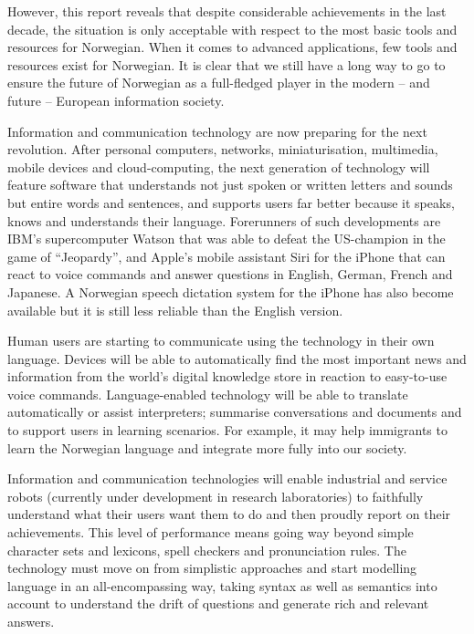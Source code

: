 \begin{multicols}{2}
However, this report reveals that despite considerable achievements in the last decade, the situation is only acceptable with respect to the most basic tools and resources for Norwegian. When it comes to advanced applications, few tools and resources exist for Norwegian. It is clear that we still have a long way to go to ensure the future of Norwegian as a full-fledged player in the modern -- and future -- European information society. 

Information and communication technology are now preparing for the next revolution. After personal computers, networks, miniaturisation, multimedia, mobile devices and cloud-computing, the next generation of technology will feature software that understands not just spoken or written letters and sounds but entire words and sentences, and supports users far better because it speaks, knows and understands their language. Forerunners of such developments are IBM’s supercomputer Watson that was able to defeat the US-champion in the game of “Jeopardy”, and Apple’s mobile assistant Siri for the iPhone that can react to voice commands and answer questions in English, German, French and Japanese. A Norwegian speech dictation system for the iPhone has also become available but it is still less reliable than the English version.

Human users are starting to communicate using the technology in their own language. Devices will be able to automatically find the most important news and information from the world’s digital knowledge store in reaction to easy-to-use voice commands. Language-enabled technology will be able to translate automatically or assist interpreters; summarise conversations and documents and to support users in learning scenarios. For example, it may help immigrants to learn the Norwegian language and integrate more fully into our society.
 
Information and communication technologies will enable industrial and service robots (currently under development in research laboratories) to faithfully understand what their users want them to do and then proudly report on their achievements. This level of performance means going way beyond simple character sets and lexicons, spell checkers and pronunciation rules. The technology must move on from simplistic approaches and start modelling language in an all-encompassing way, taking syntax as well as semantics into account to understand the drift of questions and generate rich and relevant answers.


\end{multicols}
